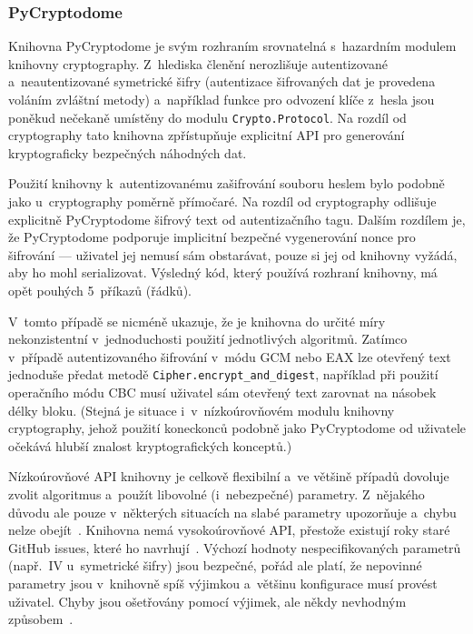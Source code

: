 \subsubsection*{PyCryptodome}

Knihovna PyCryptodome je svým rozhraním srovnatelná s~hazardním modulem knihovny cryptography. Z~hlediska členění nerozlišuje autentizované a~neautentizované symetrické šifry (autentizace šifrovaných dat je provedena voláním zvláštní metody) a~například funkce pro odvození klíče z~hesla jsou poněkud nečekaně umístěny do modulu \texttt{Crypto.Protocol}. Na rozdíl od cryptography tato knihovna zpřístupňuje explicitní API pro generování kryptograficky bezpečných náhodných dat.

Použití knihovny k~autentizovanému zašifrování souboru heslem bylo podobně jako u~cryptography poměrně přímočaré. Na rozdíl od cryptography odlišuje explicitně PyCryptodome šifrový text od autentizačního tagu. Dalším rozdílem je, že PyCryptodome podporuje implicitní bezpečné vygenerování nonce pro šifrování --- uživatel jej nemusí sám obstarávat, pouze si jej od knihovny vyžádá, aby ho mohl serializovat. Výsledný kód, který používá rozhraní knihovny, má opět pouhých 5~příkazů (řádků).

V~tomto případě se nicméně ukazuje, že je knihovna do určité míry nekonzistentní v~jednoduchosti použití jednotlivých algoritmů. Zatímco v~případě autentizovaného šifrování v~módu GCM nebo EAX lze otevřený text jednoduše předat metodě \texttt{Cipher.encrypt\_and\_digest}, například při použití operačního módu CBC musí uživatel sám otevřený text zarovnat na násobek délky bloku. (Stejná je situace i~v~nízkoúrovňovém modulu knihovny cryptography, jehož použití koneckonců podobně jako PyCryptodome od uživatele očekává hlubší znalost kryptografických konceptů.)

Nízkoúrovňové API knihovny je celkově flexibilní a~ve většině případů dovoluje zvolit algoritmus a~použít libovolné (i~nebezpečné) parametry. Z~nějakého důvodu ale pouze v~některých situacích na slabé parametry upozorňuje a~chybu nelze obejít~\cite{pcd-issue-720}. Knihovna nemá vy\-so\-ko\-ú\-rov\-ňo\-vé API, přestože existují roky staré GitHub issues, které ho navrhují~\cite{pcd-issue-57}. Výchozí hodnoty nespecifikovaných parametrů (např.\ IV u~symetrické šifry) jsou bezpečné, pořád ale platí, že nepovinné parametry jsou v~knihovně spíš výjimkou a~většinu konfigurace musí provést uživatel. Chyby jsou ošetřovány pomocí výjimek, ale někdy nevhodným způsobem~\cite{pcd-issue-320}.

